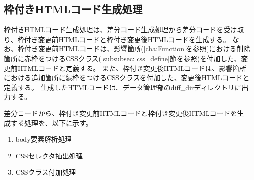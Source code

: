 
\subsection{枠付きHTMLコード生成処理}\label{subsec:modified_html_generate}
枠付きHTMLコード生成処理は、差分コード生成処理から差分コードを受け取り、枠付き変更前HTMLコードと枠付き変更後HTMLコードを生成する。
なお、枠付き変更前HTMLコードは、影響箇所(\ref{cha:Function}を参照)における削除箇所に赤枠をつけるCSSクラス(\ref{subsubsec: css_define}節を参照)を付加した、変更前HTMLコードと定義する。
また、枠付き変更後HTMLコードは、影響箇所における追加箇所に緑枠をつけるCSSクラスを付加した、変更後HTMLコードと定義する。
生成したHTMLコードは、データ管理部のdiff\_dirディレクトリに出力する。
\par
差分コードから、枠付き変更前HTMLコードと枠付き変更後HTMLコードを生成する処理を、以下に示す。
\begin{enumerate}
    \item body要素解析処理
    \item CSSセレクタ抽出処理
    \item CSSクラス付加処理
\end{enumerate}

